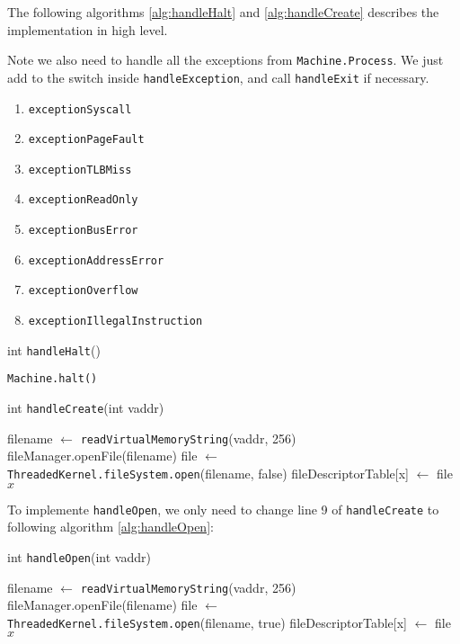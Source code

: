 \documentclass{article}
\begin{document}
\begin{spacing}{1.1}
The following algorithms \ref{alg:handleHalt} and \ref{alg:handleCreate} describes the implementation in high level.

Note we also need to handle all the exceptions from \texttt{Machine.Process}. We just add to the switch inside \texttt{handleException}, and call \texttt{handleExit} if necessary.
\begin{enumerate}[$\bullet$]
\item \texttt{exceptionSyscall}
\item \texttt{exceptionPageFault}
\item \texttt{exceptionTLBMiss}
\item \texttt{exceptionReadOnly}
\item \texttt{exceptionBusError}
\item \texttt{exceptionAddressError}
\item \texttt{exceptionOverflow}
\item \texttt{exceptionIllegalInstruction}
\end{enumerate}

\begin{algorithm}[htbp]
  \label{alg:handleHalt}
  \caption{int \texttt{handleHalt}()}
\begin{algorithmic}[1]
  \ENDIF
  \STATE \texttt{Machine.halt()}
\end{algorithmic}
\end{algorithm}

\begin{algorithm}[htbp]
  \label{alg:handleCreate}
  \caption{int \texttt{handleCreate}(int vaddr)}
\begin{algorithmic}[1]
  \ENDIF
  \STATE filename $\leftarrow$ \texttt{readVirtualMemoryString}(vaddr, 256)
  \ENDIF
    \STATE fileManager.openFile(filename)
    \STATE file $\leftarrow$ \texttt{ThreadedKernel.fileSystem.open}(filename, false)
    \STATE fileDescriptorTable[x] $\leftarrow$ file
    \RETURN $x$
  \ELSE
  \ENDIF
\end{algorithmic}
\end{algorithm}

To implemente \texttt{handleOpen}, we only need to change line 9 of \texttt{handleCreate} to following algorithm \ref{alg:handleOpen}:
\begin{algorithm}[htbp]
  \label{alg:handleOpen}
  \caption{int \texttt{handleOpen}(int vaddr)}
\begin{algorithmic}[1]
  \ENDIF
  \STATE filename $\leftarrow$ \texttt{readVirtualMemoryString}(vaddr, 256)
  \ENDIF
    \STATE fileManager.openFile(filename)
    \STATE \colorbox{myyellow}{file $\leftarrow$ \texttt{ThreadedKernel.fileSystem.open}(filename, true)}
    \STATE fileDescriptorTable[x] $\leftarrow$ file
    \RETURN $x$
  \ELSE
  \ENDIF
\end{algorithmic}
\end{algorithm}


\end{spacing}
\end{document}
